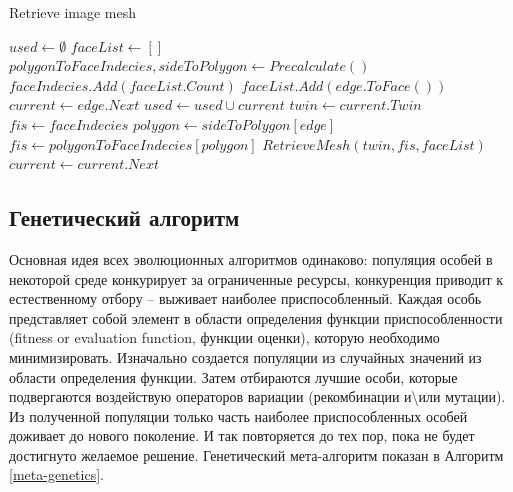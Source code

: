 \documentclass{fefu_thesis/cls/fefu}
\newenvironment{algo}[1][]
  {\begin{algorithm}[#1]
     \selectlanguage{english}
     \floatname{algorithm}{Алгоритм}
  }
  {\end{algorithm}}
\newcommand*\talgref[1]{Алгоритм \ref{#1}}
\begin{document}
    \begin{algo}[H]
        \caption{Retrieve image mesh}
        \begin{algorithmic}[1]
            \State $used \gets \emptyset$
            \State $faceList \gets []$
            \State $polygonToFaceIndecies, sideToPolygon \gets Precalculate()$
                 
                    \State $faceIndecies.Add(faceList.Count)$
                    \State $faceList.Add(edge.ToFace())$
                    \State $current \gets edge.Next$
                            \State $used \gets used \cup current$
                            \State $twin \gets current.Twin$
                            \State $fis \gets faceIndecies$
                                \State $polygon \gets sideToPolygon[edge]$ 
                                \State $fis \gets polygonToFaceIndecies[polygon]$
                            \EndIf
                            \State $RetrieveMesh(twin, fis, faceList)$
                        \EndIf
                    \EndWhile
                \EndIf
                \State $current \gets current.Next$
            \EndProcedure
        \end{algorithmic}
    \end{algo}

    \subsection{Генетический алгоритм}
    Основная идея всех эволюционных алгоритмов одинаково: популяция особей в некоторой среде конкурирует за ограниченные ресурсы, конкуренция приводит к естественному отбору -- выживает наиболее приспособленный. Каждая особь представляет собой элемент в области определения функции приспособленности (fitness or evaluation function, функции оценки), которую необходимо минимизировать. Изначально создается популяции из случайных значений из области определения функции. Затем отбираются лучшие особи, которые подвергаются воздействую операторов вариации (рекомбинации и\textbackslash или мутации). Из полученной популяции только часть наиболее приспособленных особей доживает до нового поколение. И так повторяется до тех пор, пока не будет достигнуто желаемое решение. Генетический мета-алгоритм показан в \talgref{meta-genetics}.
\end{document}
